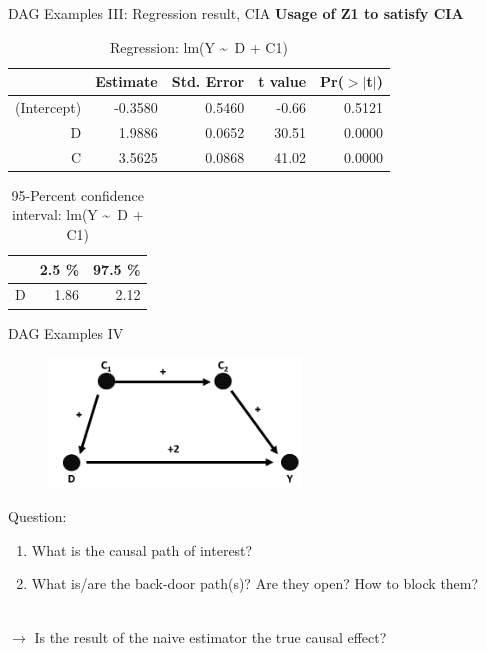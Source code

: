 \documentclass{beamer}\usepackage[]{graphicx}\usepackage[]{color}
\begin{document}
\begin{frame}[fragile]{DAG Examples III: Regression result, CIA}
\textbf{Usage of Z1 to satisfy CIA}
\begin{table}[ht]
\centering
\begingroup\small
\begin{tabular}{rrrrr}
  \hline
 & Estimate & Std. Error & t value & Pr($>$$|$t$|$) \\ 
  \hline
(Intercept) & -0.3580 & 0.5460 & -0.66 & 0.5121 \\ 
  D & 1.9886 & 0.0652 & 30.51 & 0.0000 \\ 
  C & 3.5625 & 0.0868 & 41.02 & 0.0000 \\ 
   \hline
\end{tabular}
\endgroup
\caption{Regression: lm(Y \textasciitilde ~D + C1)} 
\end{table}
\begin{table}[ht]
\centering
\begingroup\small
\begin{tabular}{rrr}
  \hline
 & 2.5 \% & 97.5 \% \\ 
  \hline
D & 1.86 & 2.12 \\ 
   \hline
\end{tabular}
\endgroup
\caption{95-Percent confidence interval: lm(Y \textasciitilde ~D + C1)} 
\end{table}

\end{frame}





\begin{frame}{DAG Examples IV}
\\[1em]
\begin{figure}
\centering
\includegraphics[width=0.6\textwidth]{Graphics/4.LongBack-doorPath-Oversized.png}
\end{figure}
Question:
\begin{enumerate}
\item What is the causal path of interest?
\item What is/are the back-door path(s)? Are they open? How to block them?
\end{enumerate}
\\[1em]
$\rightarrow$ Is the result of the naive estimator the true causal effect?
\end{frame}
\end{document}
